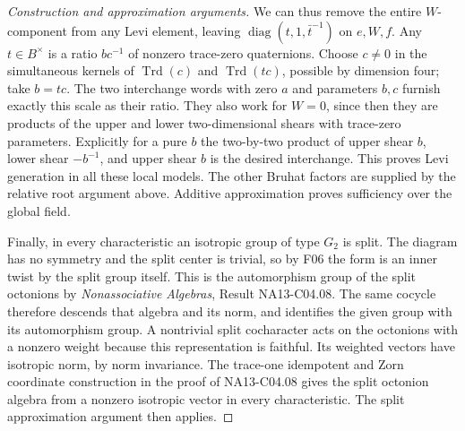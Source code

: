\documentclass[11pt,a4paper,openany,oneside]{book}
\theoremstyle{resultstyle}
\theoremstyle{definition}
\numberwithin{equation}{chapter}
\begin{document}
\begin{proof}[Construction and approximation arguments]
We can thus remove the entire \(W\)-component from any
Levi element, leaving \(\operatorname{diag}(t,1,\bar t^{-1})\)
on \(e,W,f\). Any \(t\in B^\times\) is a ratio \(b c^{-1}\)
of nonzero trace-zero quaternions. Choose \(c\ne0\) in
the simultaneous kernels of \(\operatorname{Trd}(c)\)
and \(\operatorname{Trd}(tc)\), possible by
dimension four; take \(b=tc\). The two interchange
words with zero \(a\) and parameters \(b,c\) furnish
exactly this scale as their ratio. They also work for
\(W=0\), since then they are products of the upper and
lower two-dimensional shears with trace-zero
parameters. Explicitly for a pure \(b\) the two-by-two
product of upper shear \(b\), lower shear \(-b^{-1}\),
and upper shear \(b\) is the desired interchange.
This proves Levi generation in all these local models.
The other Bruhat factors are supplied by the relative
root argument above. Additive approximation proves
sufficiency over the global field.

Finally, in every characteristic an isotropic group
of type \(G_2\) is split. The diagram
has no symmetry and the split center is trivial, so
by F06 the form is an inner twist by the split group
itself. This is the automorphism group of the split
octonions by \emph{Nonassociative Algebras},
Result NA13-C04.08. The same cocycle therefore
descends that algebra and its norm, and identifies the
given group with its automorphism group. A nontrivial
split cocharacter acts on the octonions with a nonzero
weight because this representation is faithful. Its
weighted vectors have isotropic norm, by norm
invariance. The trace-one idempotent and Zorn
coordinate construction in the proof of NA13-C04.08
gives the split octonion algebra from a nonzero
isotropic vector in every characteristic. The split
approximation argument then applies.


\end{proof}
\end{document}
